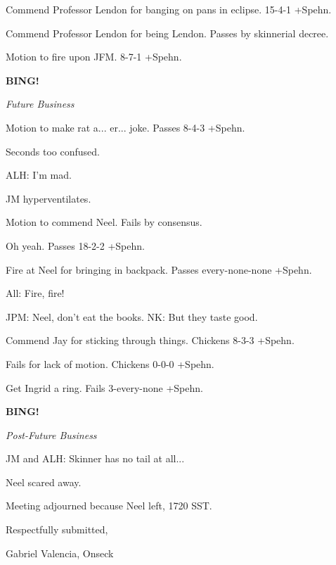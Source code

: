 \documentclass[12pt]{article}
\newcommand{\bing}{{\bf BING!} }
\newcommand{\goto}[1]{\bing \vskip 12pt \centerline{{\em{#1}}}}
\begin{document}
Commend Professor Lendon for banging on pans in eclipse. 15-4-1 +Spehn.

Commend Professor Lendon for being Lendon. Passes by skinnerial decree.

Motion to fire upon JFM. 8-7-1 +Spehn.

\goto{Future Business}

Motion to make rat a... er... joke. Passes 8-4-3 +Spehn.

Seconds too confused.

ALH: I'm mad.

JM hyperventilates.

Motion to commend Neel. Fails by consensus.

Oh yeah. Passes 18-2-2 +Spehn.

Fire at Neel for bringing in backpack. Passes every-none-none +Spehn.

All: Fire, fire!

JPM: Neel, don't eat the books. NK: But they taste good.

Commend Jay for sticking through things. Chickens 8-3-3 +Spehn.

Fails for lack of motion. Chickens 0-0-0 +Spehn.

Get Ingrid a ring. Fails 3-every-none +Spehn.

\goto{Post-Future Business}

JM and ALH: Skinner has no tail at all...

Neel scared away.

\vspace{12pt}

\noindent
Meeting adjourned because Neel left, 1720 SST.

\vspace{18pt}

\centerline{Respectfully submitted,}
\centerline{Gabriel Valencia, Onseck}
\end{document}
